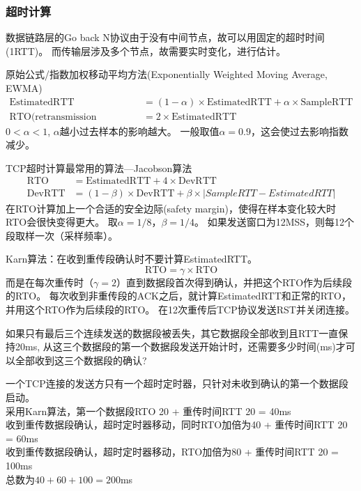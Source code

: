 \subsubsection{超时计算}
数据链路层的Go back N协议由于没有中间节点，故可以用固定的超时时间(1RTT)。
而传输层涉及多个节点，故需要实时变化，进行估计。

原始公式/指数加权移动平均方法(Exponentially Weighted Moving Average, EWMA)
\[\begin{aligned}
    \text{EstimatedRTT} &= (1-\alpha)\times \text{EstimatedRTT} + \alpha \times \text{SampleRTT}\\
    \text{RTO(retransmission timeout)} &= 2\times \text{EstimatedRTT}
\end{aligned}\]
$0<\alpha<1$, $\alpha$越小过去样本的影响越大。
一般取值$\alpha=0.9$，这会使过去影响指数减少。

\myhline
TCP超时计算最常用的算法---Jacobson算法
\[\begin{aligned}
    \text{RTO} &= \text{EstimatedRTT} + 4\times \text{DevRTT}\\
    \text{DevRTT} &=(1-\beta)\times\text{DevRTT} + \beta\times|SampleRTT-EstimatedRTT|
\end{aligned}\]
在RTO计算加上一个合适的安全边际(safety margin)，使得在样本变化较大时RTO会很快变得更大。
取$\alpha=1/8$，$\beta = 1/4$。
如果发送窗口为12MSS，则每12个段取样一次（采样频率）。

\myhline
Karn算法：在收到重传段确认时不要计算EstimatedRTT。
\[\text{RTO} = \gamma\times\text{RTO}\]
而是在每次重传时（$\gamma=2$）直到数据段首次得到确认，并把这个RTO作为后续段的RTO。
每次收到非重传段的ACK之后，就计算EstimatedRTT和正常的RTO，并用这个RTO作为后续段的RTO。
在12次重传后TCP协议发送RST并关闭连接。

\begin{example}
    如果只有最后三个连续发送的数据段被丢失，其它数据段全部收到且RTT一直保持20ms, 从这三个数据段的第一个数据段发送开始计时，还需要多少时间(ms)才可以全部收到这三个数据段的确认?
\end{example}
\begin{analysis}
    一个TCP连接的发送方只有一个超时定时器，只针对未收到确认的第一个数据段启动。\\
    采用Karn算法，第一个数据段RTO 20 + 重传时间RTT 20 = 40ms\\
    收到重传数据段确认，超时定时器移动，同时RTO加倍为40 + 重传时间RTT 20 = 60ms\\
    收到重传数据段确认，超时定时器移动，RTO加倍为80 + 重传时间RTT 20 = 100ms\\
    总数为$40+60+100=200$ms
\end{analysis}

